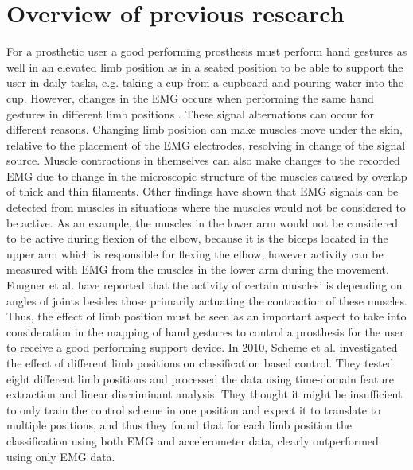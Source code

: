 \section{Overview of previous research}

For a prosthetic user a good performing prosthesis must perform hand gestures as well in an elevated limb position as in a seated position to be able to support the user in daily tasks, e.g. taking a cup from a cupboard and pouring water into the cup. However, changes in the EMG occurs when performing the same hand gestures in different limb positions \cite{Fougner2011, avella2006}. These signal alternations can occur for different reasons. Changing limb position can make muscles move under the skin, relative to the placement of the EMG electrodes, resolving in change of the signal source. Muscle contractions in themselves can also make changes to the recorded EMG due to change in the microscopic structure of the muscles caused by overlap of thick and thin filaments. \cite{martini}  
Other findings have shown that EMG signals can be detected from muscles in situations where the muscles would not be considered to be active. As an example, the muscles in the lower arm would not be considered to be active during flexion of the elbow, because it is the biceps located in the upper arm which is responsible for flexing the elbow, however activity can be measured with EMG from the muscles in the lower arm during the movement. Fougner et al. \cite{Fougner2011} have reported that the activity of certain muscles' is depending on angles of joints besides those primarily actuating the contraction of these muscles. Thus, the effect of limb position must be seen as an important aspect to take into consideration in the mapping of hand gestures to control a prosthesis for the user to receive a good performing support device. %
In 2010, Scheme et al. \cite{Fougner2010} investigated the effect of different limb positions on classification based control. They tested eight different limb positions and processed the data using time-domain feature extraction and linear discriminant analysis. They thought it might be insufficient to only train the control scheme in one position and expect it to translate to multiple positions, and thus they found that for each limb position the classification using both EMG and accelerometer data, clearly outperformed using only EMG data. \cite{Fougner2010}

